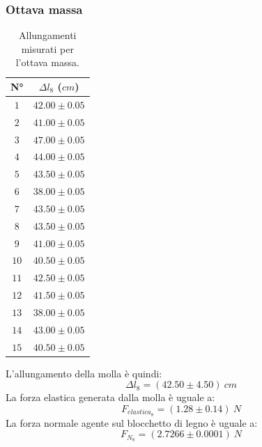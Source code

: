 \documentclass[11pt]{article}
\begin{document}
\subsubsection{Ottava massa}
\begin{table}[H]
\centering
\begin{tabular}{|c|c|}
\hline
\textbf{N°} & \textbf{$\Delta l_8$ ($cm$)}\\
\hline
$1$ & $42.00\pm 0.05$ \\
\hline
$2$ & $41.00\pm 0.05$ \\
\hline
$3$ & $47.00\pm 0.05$ \\
\hline
$4$ & $44.00\pm 0.05$ \\
\hline
$5$ & $43.50\pm 0.05$ \\
\hline
$6$ & $38.00\pm 0.05$ \\
\hline
$7$ & $43.50\pm 0.05$ \\
\hline
$8$ & $43.50\pm 0.05$ \\
\hline
$9$ & $41.00\pm 0.05$ \\
\hline
$10$ & $40.50\pm 0.05$ \\
\hline
$11$ & $42.50\pm 0.05$ \\
\hline
$12$ & $41.50\pm 0.05$ \\
\hline
$13$ & $38.00\pm 0.05$ \\
\hline
$14$ & $43.00\pm 0.05$ \\
\hline
$15$ & $40.50\pm 0.05$ \\
\hline
\end{tabular}
\caption{Allungamenti misurati per l'ottava massa.}
\label{tab:}
\end{table}
L'allungamento della molla è quindi:
\begin{equation}
    \Delta l_8=(42.50\pm 4.50)\ cm
\end{equation}
La forza elastica generata dalla molla è uguale a:
\begin{equation}
    F_{elastica_8} = (1.28\pm 0.14)\ N
\end{equation}
La forza normale agente sul blocchetto di legno è uguale a:
\begin{equation}
    F_{N_8} = (2.7266\pm 0.0001)\ N
\end{equation}
\end{document}
